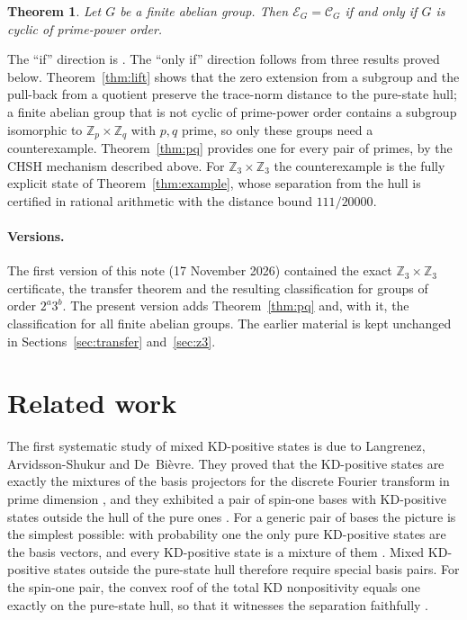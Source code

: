 \documentclass[11pt,a4paper]{article}
\newtheorem{theorem}{Theorem}
\theoremstyle{definition}
\theoremstyle{plain}
\newenvironment{statementframe}{%
  \par\addvspace{0.55\baselineskip}\noindent
  \begingroup\setlength{\fboxrule}{0.3pt}\setlength{\fboxsep}{7pt}%
  \begin{lrbox}{\statementbox}%
  \begin{minipage}{\dimexpr\linewidth-2\fboxsep-2\fboxrule\relax}%
}{%
  \end{minipage}\end{lrbox}%
  {\color{black!45}\fbox{\color{black}\usebox{\statementbox}}}%
  \endgroup\par\addvspace{0.45\baselineskip}%
}
\newcommand{\Z}{\mathbb Z}
\newcommand{\E}{\mathcal E}
\newcommand{\hull}{\mathcal C}
\begin{document}
\begin{statementframe}
\begin{theorem}\label{thm:main}
Let $G$ be a finite abelian group. Then $\E_G=\hull_G$ if and only if $G$ is
cyclic of prime-power order.
\end{theorem}
\end{statementframe}

The ``if'' direction is \cite[Theorem~6.1]{DLR}. The ``only if'' direction
follows from three results proved below. Theorem~\ref{thm:lift} shows that the
zero extension from a subgroup and the pull-back from a quotient preserve the
trace-norm distance to the pure-state hull; a finite abelian group that is not
cyclic of prime-power order contains a subgroup isomorphic to
$\Z_p\times\Z_q$ with $p,q$ prime, so only these groups need a
counterexample. Theorem~\ref{thm:pq} provides one for every pair of primes,
by the CHSH mechanism described above. For $\Z_3\times\Z_3$ the counterexample
is the fully explicit state of Theorem~\ref{thm:example}, whose separation
from the hull is certified in rational arithmetic with the distance bound
$111/20000$.

\paragraph{Versions.}
The first version of this note (17 November 2026) contained the exact
$\Z_3\times\Z_3$ certificate, the transfer theorem and the resulting
classification for groups of order $2^a3^b$. The present version adds
Theorem~\ref{thm:pq} and, with it, the classification for all finite abelian
groups. The earlier material is kept unchanged in
Sections~\ref{sec:transfer} and~\ref{sec:z3}.

\section{Related work}
The first systematic study of mixed KD-positive states is due to Langrenez,
Arvidsson-Shukur and De~Bi\`evre. They proved that the KD-positive states are
exactly the mixtures of the basis projectors for the discrete Fourier
transform in prime dimension \cite[Theorem~1.1(iii)]{LAD}, and they exhibited
a pair of spin-one bases with KD-positive states outside the hull of the pure
ones \cite[Section~5.2]{LAD}. For a generic pair of bases the picture is the
simplest possible: with probability one the only pure KD-positive states are
the basis vectors, and every KD-positive state is a mixture of them
\cite[Theorem~1]{almost}. Mixed KD-positive states outside the pure-state
hull therefore require special basis pairs. For the spin-one pair, the convex
roof of the total KD nonpositivity equals one exactly on the pure-state hull,
so that it witnesses the separation faithfully
\cite[Section~4 and Appendix~B]{convexroof}.
\end{document}
